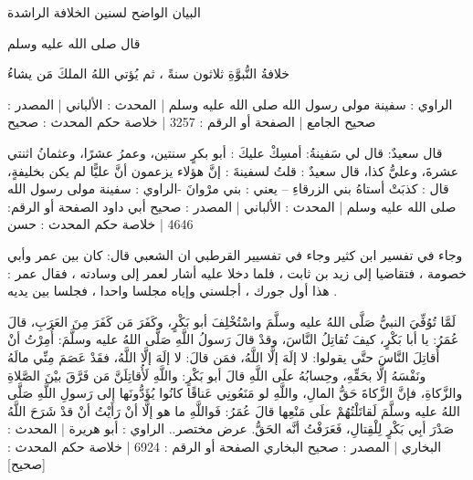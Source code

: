 

البيان الواضح لسنين الخلافة الراشدة


قال صلى الله عليه وسلم 

خلافةُ النُّبوَّةِ ثلاثون سنةً ، ثم يُؤتي اللهُ الملكَ مَن يشاءُ

الراوي : سفينة مولى رسول الله صلى الله عليه وسلم | المحدث : الألباني | المصدر : صحيح الجامع | الصفحة أو الرقم : 3257 | خلاصة حكم المحدث : صحيح
   
قال سعيدٌ: قال لي سَفينةُ: أمسِكْ عليكَ : أبو بكرٍ سنتين، وعمرُ عشرًا، وعثمانُ اثنتي عشرةَ، وعليُّ كذا، قال سعيدٌ : قلتُ لسفينةَ : إنَّ هؤلاء يزعمون أنَّ عليًّا لم يكن بخليفةٍ، قال : كذبَتْ أستاهُ بني الزرقاءِ – يعني : بني مرْوانَ -الراوي : سفينة مولى رسول الله صلى الله عليه وسلم | المحدث : الألباني | المصدر : صحيح أبي داود
الصفحة أو الرقم: 4646 | خلاصة حكم المحدث : حسن

وجاء في تفسير ابن كثير 
وجاء في تفسيير القرطبي ان الشعبي قال: كان بين عمر وأبي خصومة ، فتقاضيا إلى زيد بن ثابت ، فلما دخلا عليه أشار لعمر إلى وسادته ، فقال عمر : هذا أول جورك ، أجلسني وإياه مجلسا واحدا ، فجلسا بين يديه .


لَمَّا تُوُفِّيَ النبيُّ صَلَّى اللهُ عليه وسلَّمَ واسْتُخْلِفَ أبو بَكْرٍ، وكَفَرَ مَن كَفَرَ مِنَ العَرَبِ، قالَ عُمَرُ: يا أبا بَكْرٍ، كيفَ تُقاتِلُ النَّاسَ، وقدْ قالَ رَسولُ اللَّهِ صَلَّى اللهُ عليه وسلَّمَ: أُمِرْتُ أنْ أُقاتِلَ النَّاسَ حتَّى يقولوا: لا إلَهَ إلَّا اللَّهُ، فمَن قالَ: لا إلَهَ إلَّا اللَّهُ، فقَدْ عَصَمَ مِنِّي مالَهُ ونَفْسَهُ إلَّا بحَقِّهِ، وحِسابُهُ علَى اللَّهِ قالَ أبو بَكْرٍ: واللَّهِ لَأُقاتِلَنَّ مَن فَرَّقَ بيْنَ الصَّلاةِ والزَّكاةِ، فإنَّ الزَّكاةَ حَقُّ المالِ، واللَّهِ لو مَنَعُونِي عَناقًا كانُوا يُؤَدُّونَها إلى رَسولِ اللَّهِ صَلَّى اللهُ عليه وسلَّمَ لَقاتَلْتُهُمْ علَى مَنْعِها قالَ عُمَرُ: فَواللَّهِ ما هو إلَّا أنْ رَأَيْتُ أنْ قدْ شَرَحَ اللَّهُ صَدْرَ أبِي بَكْرٍ لِلْقِتالِ، فَعَرَفْتُ أنَّه الحَقُّ.
عرض مختصر..
الراوي : أبو هريرة | المحدث : البخاري | المصدر : صحيح البخاري
الصفحة أو الرقم : 6924 | خلاصة حكم المحدث : [صحيح]

